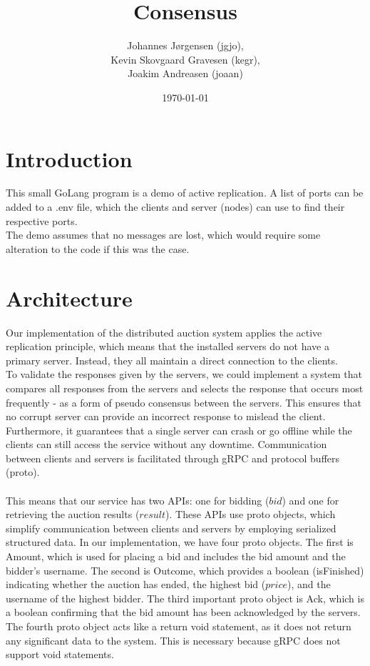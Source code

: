 \documentclass[a4paper,11pt]{article}
\title{Consensus}
\author{Johannes Jørgensen (jgjo),\\ Kevin Skovgaard Gravesen (kegr),\\ Joakim Andreasen (joaan)}
\date{\today}
\begin{document}
 

\maketitle

\section{Introduction}
This small GoLang program is a demo of active replication. A list of ports can be added to a .env file,
which the clients and server (nodes) can use to find their respective ports.
\\
The demo assumes that no messages are lost, which would require some alteration to the code if this was the case.

\section{Architecture}
Our implementation of the distributed auction system applies the active replication principle, which means that the installed servers do not have a primary server. Instead, they all maintain a direct connection to the clients.\\
To validate the responses given by the servers, we could implement a system that compares all responses from the servers and selects the response that occurs most frequently - as a form of pseudo consensus between the servers. This ensures that no corrupt server can provide an incorrect response to mislead the client.
Furthermore, it guarantees that a single server can crash or go offline while the clients can still access the service without any downtime. Communication between clients and servers is facilitated through gRPC and protocol buffers (proto).\\\\
This means that our service has two APIs: one for bidding ($bid$) and one for retrieving the auction results ($result$). These APIs use proto objects, which simplify communication between clients and servers by employing serialized structured data.
In our implementation, we have four proto objects. The first is Amount, which is used for placing a bid and includes the bid amount and the bidder’s username. The second is Outcome, which provides a boolean (isFinished) indicating whether the auction has ended, the highest bid ($price$), and the username of the highest bidder. The third important proto object is Ack, which is a boolean confirming that the bid amount has been acknowledged by the servers.
The fourth proto object acts like a return void statement, as it does not return any significant data to the system. This is necessary because gRPC does not support void statements.
\end{document}
